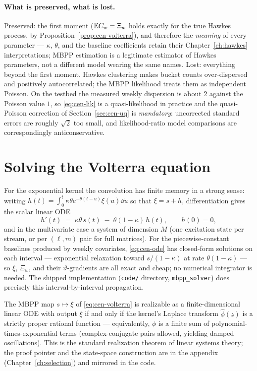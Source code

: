 \paragraph{What is preserved, what is lost.}
Preserved: the first moment ($\mathbb{E} C_w = \Xi_w$ holds exactly for the true Hawkes process,
by Proposition~\ref{prop:cen-volterra}), and therefore the \emph{meaning} of every
parameter --- $\kappa$, $\theta$, and the baseline coefficients retain their
Chapter~\ref{ch:hawkes} interpretations; MBPP estimation is a legitimate estimator of
Hawkes parameters, not a different model wearing the same names. Lost: everything beyond
the first moment. Hawkes clustering makes bucket counts over-dispersed and positively
autocorrelated; the MBPP likelihood treats them as independent Poisson. On the testbed the
measured weekly dispersion is about $2$ against the Poisson value $1$, so
\eqref{eq:cen-lik} is a quasi-likelihood in practice and the quasi-Poisson correction of
Section~\ref{sec:cen-uq} is \emph{mandatory}: uncorrected standard errors are roughly
$\sqrt{2}$ too small, and likelihood-ratio model comparisons are correspondingly
anticonservative.

\section{Solving the Volterra equation}
\label{sec:cen-solve}

For the exponential kernel the convolution has finite memory in a strong sense: writing
$h(t) = \int_0^t \kappa\theta e^{-\theta(t-u)} \xi(u)\dd u$ so that $\xi = s + h$,
differentiation gives the scalar linear ODE
\begin{equation}
\label{eq:cen-ode}
h'(t) \;=\; \kappa\theta\, s(t) \;-\; \theta(1-\kappa)\, h(t), \qquad h(0)=0 ,
\end{equation}
and in the multivariate case a system of dimension $M$ (one excitation state per stream,
or per $(\ell,m)$ pair for full matrices). For the piecewise-constant baselines produced
by weekly covariates, \eqref{eq:cen-ode} has closed-form solutions on each interval ---
exponential relaxation toward $s/(1-\kappa)$ at rate $\theta(1-\kappa)$ --- so $\xi$,
$\Xi_w$, and their $\vartheta$-gradients are all exact and cheap; no numerical integrator
is needed. The shipped implementation (\texttt{code/} directory,
\texttt{mbpp\_solver}) does precisely this interval-by-interval propagation.

\begin{proposition}
\label{prop:cen-rational}
The MBPP map $s \mapsto \xi$ of \eqref{eq:cen-volterra} is realizable as a
finite-dimensional linear ODE with output $\xi$ if and only if the kernel's Laplace
transform $\hat\phi(z)$ is a strictly proper rational function --- equivalently, $\phi$ is
a finite sum of polynomial-times-exponential terms (complex-conjugate pairs allowed,
yielding damped oscillations). This is the standard realization theorem of linear systems
theory; the proof pointer and the state-space construction are in the appendix
(Chapter~\ref{ch:selection}) and mirrored in the code.
\end{proposition}

